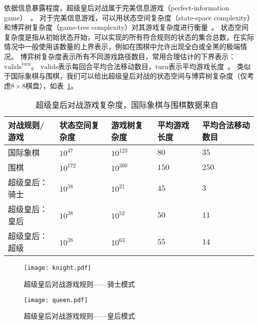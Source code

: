 依据信息暴露程度，超级皇后对战属于完美信息游戏（perfect-information game）~\cite{binmore2007game}。
对于完美信息游戏，可以用状态空间复杂度（state-space complexity）和博弈树复杂度（game-tree complexity）对其游戏复杂度进行衡量~\cite{allis1994searching,VANDENHERIK2002277}。
状态空间复杂度是指从初始状态开始，可以实现的所有符合规则的状态的集合总数，在实际情况中一般使用该数量的上界表示，例如在围棋中允许出现全白或全黑的极端情况。
博弈树复杂度表示所有不同游戏路径数目，常用合理估计的下界表示：$\text{valids}^{\text{turn}}$。 $\text{valids}$表示每回合平均合法移动数目，$\text{turn}$表示平均游戏长度~\cite{10.1007/BF00992697}。
类似于国际象棋与围棋，我们可以给出超级皇后对战的状态空间与博弈树复杂度（仅考虑$8\times8$棋盘），如表~\ref{table:complexity}。
\begin{table}[htb]
  \centering
  \caption[complexity]{超级皇后对战游戏复杂度，国际象棋与围棋数据来自~\cite{enwiki:complexity}}
  \begin{tabular}{p{3cm}<{\centering} p{2cm}<{\centering} p{2cm}<{\centering} p{2cm}<{\centering} p{2cm}<{\centering}}
  \hline
  对战规则/游戏 & 状态空间复杂度 & 游戏树复杂度 & 平均游戏长度 & 平均合法移动数目 \\ \hline
  国际象棋 & $10^{47}$ & $10^{123}$&$80$ &$35$\\ 
      围棋 & $10^{172}$ & $10^{360}$&$150$ &$250$ \\ 
      超级皇后：骑士 & $10^{38}$ & $10^{21}$ &$45$ & $3$\\ 
      超级皇后：皇后 & $10^{38}$ & $10^{52}$ & $50$ & $11$\\ 
      超级皇后：超级 & $10^{38}$ & $10^{63}$ & $55$ & $14$\\ \hline
  \end{tabular}
  \label{table:complexity}
\end{table}

\begin{figure}[htb]
    \centering
    \texttt{[image: knight.pdf]}
    \caption[rules-knight]{%
        超级皇后对战游戏规则——骑士模式%
      }
    \label{fig:knight}
\end{figure}

\begin{figure}[htb]
    \centering
    \texttt{[image: queen.pdf]}
    \caption[rules-queen]{%
        超级皇后对战游戏规则——皇后模式%
      }
    \label{fig:queen}
\end{figure}

